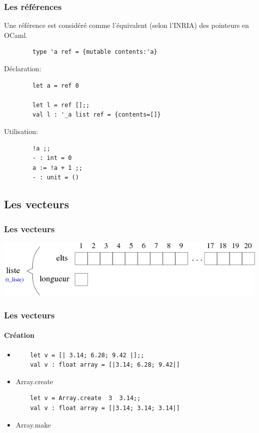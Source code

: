 \begin{frame}[fragile]
	\frametitle{Les références}
	Une référence est considéré comme l'équivalent (selon l'INRIA) des pointeurs en OCaml.
	\begin{lstlisting}
		type 'a ref = {mutable contents:'a}
	\end{lstlisting}
	Déclaration:
	\begin{lstlisting}
		let a = ref 0

		let l = ref [];;
		val l : '_a list ref = {contents=[]}
	\end{lstlisting}
	Utilisation:
	\begin{lstlisting}
		!a ;;
		- : int = 0
		a := !a + 1 ;;
		- : unit = ()
	\end{lstlisting}

\end{frame}

\subsection{Les vecteurs}

\begin{frame}
	\frametitle{Les vecteurs}
	\includegraphics[scale=0.5]{pics/vect.png}
\end{frame}

\begin{frame}[fragile]
	\frametitle{Les vecteurs}
	\framesubtitle{Création}
	\begin{itemize}
	\item
	\begin{lstlisting}
	let v = [| 3.14; 6.28; 9.42 |];;
	val v : float array = [|3.14; 6.28; 9.42|]
	\end{lstlisting}

	\item Array.create
	\begin{lstlisting}
	let v = Array.create  3  3.14;;
	val v : float array = [|3.14; 3.14; 3.14|]
	\end{lstlisting}

	\item Array.make
	\end{itemize}
\end{frame}


